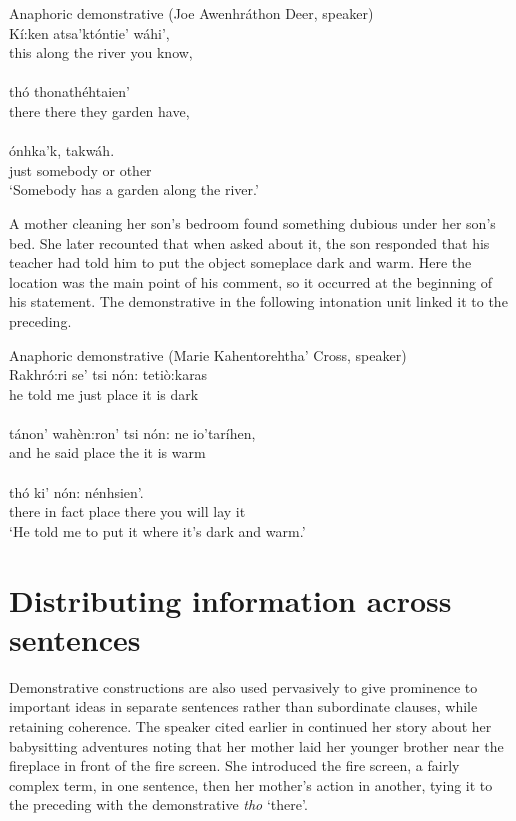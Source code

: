\documentclass[output=paper,colorlinks,citecolor=brown]{langscibook}
\begin{document}
\ea \label{ex:mithun:11} Anaphoric demonstrative (Joe Awenhráthon Deer, speaker)\\
\gll Kí:ken atsa'któntie' wáhi',\\
     this {along the river} {you know,}\\
\medskip\\
\gll thó thonathéhtaien'\\
there {there they garden have,}\\
\medskip\\
\gll ónhka'k, takwáh.\\
{just somebody} {or other}\\
\glt `Somebody has a garden along the river.'
\z

A mother cleaning her son's bedroom found something dubious under her son's bed. She later recounted that when asked about it, the son responded that his teacher had told him to put the object someplace dark and warm. Here the location was the main point of his comment, so it occurred at the beginning of his statement. The demonstrative in the following intonation unit linked it to the preceding.


\ea\label{ex:mithun:12} Anaphoric demonstrative (Marie Kahentorehtha' Cross, speaker)\\
\gll  Rakhró:ri    se' {tsi nón:} tetiò:karas\\      
      {he told me} just place {it is dark}\\
\medskip\\
\gll tánon' wahèn:ron' {tsi nón:} ne io'taríhen,\\
and {he said} place the {it is warm}\\
\medskip\\
\gll thó  ki'  nón:  nénhsien'.\\
there {in fact} place {there you will lay it}\\
\glt `He told me to put it where it's dark and warm.'
\z

\section{Distributing information across sentences}

Demonstrative constructions are also used pervasively to give prominence to important ideas in separate sentences rather than subordinate clauses, while retaining coherence. The speaker cited earlier in  continued her story about her babysitting adventures noting that her mother laid her younger brother near the fireplace in front of the fire screen. She introduced the fire screen, a fairly complex term, in one sentence, then her mother's action in another, tying it to the preceding with the demonstrative \emph{tho} `there'.
\end{document}
